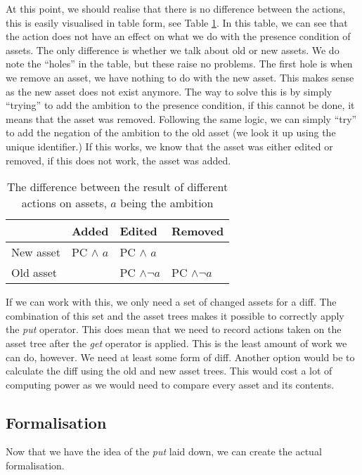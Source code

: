 At this point, we should realise that there is no difference between the
actions, this is easily visualised in table form, see Table \ref{tab:actions}.
In this table, we can see that the action does not have an effect on what
we do with the presence condition of assets. The only difference is whether we
talk about old or new assets. We do note the ``holes'' in the table, but these
raise no problems. The first hole is when we remove an asset, we have nothing
to do with the new asset. This makes sense as the new asset does not exist
anymore. The way to solve this is by simply ``trying'' to add the ambition to
the presence condition, if this cannot be done, it means that the asset was
removed. Following the same logic, we can simply ``try'' to add the negation
of the ambition to the old asset (we look it up using the unique identifier.)
If this works, we know that the asset was either edited or removed, if this
does not work, the asset was added.
\begin{table}
  \centering
  \begin{tabular}{l|lll} 
              & Added          & Edited            & Removed           \\ \hline
    New asset & PC $\land$ $a$ & PC $\land$ $a$    &                   \\ 
    Old asset &                & PC $\land \neg a$ & PC $\land \neg a$
  \end{tabular}
  \caption{The difference between the result of different actions on assets, $a$ being the ambition}
  \label{tab:actions}
\end{table}
If we can work with this, we only need a set of changed assets for a diff. The
combination of this set and the asset trees makes it possible to correctly
apply the \emph{put} operator. This does mean that we need to record actions
taken on the asset tree after the \emph{get} operator is applied. This is the
least amount of work we can do, however. We need at least some form of diff.
Another option would be to calculate the diff using the old and new asset trees.
This would cost a lot of computing power as we would need to compare every
asset and its contents.

\subsection{Formalisation}
Now that we have the idea of the \emph{put} laid down, we can create the actual
formalisation.

